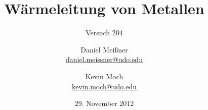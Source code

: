 

\newcommand{\name}[1]{\textsc{#1}}
\renewcommand{\d}{\ensuremath{\mathrm{d}}}

\titlehead{{TU Dortmund \hfill WS~12/13\\}
Fakultät Physik\\
Experimentelle Übungen I}

\subject{Versuchsprotokoll}
\title{Wärmeleitung von Metallen}
\subtitle{Versuch 204}

\author{Daniel Meißner\\
{\normalsize\url{daniel.meissner@udo.edu}}
\and
Kevin Moch\\
{\normalsize\url{kevin.moch@udo.edu}}}

\date{29. November 2012}


\maketitle

\tableofcontents
\clearpage










